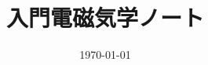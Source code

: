 \documentclass[dvipdfmx]{jlreq}
\title{入門電磁気学ノート}
\date{\today}
\begin{document}
\maketitle

\section{}
\subsection{}











\subsection{}

\subsection{}





 
\end{document}
